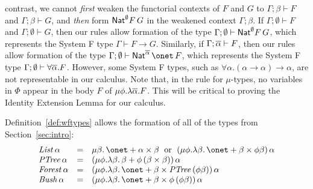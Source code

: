 \documentclass{lmcs}
\theoremstyle{plain}\newtheorem{satz}[thm]{Satz}
\begin{document}
{contrast, we cannot {\em first} weaken the functorial contexts of $F$
and $G$ to $\Gamma; \beta \vdash F$ and $\Gamma; \beta \vdash G$, and
{\em then} form $\mathsf{Nat}^\emptyset F \,G$ in the weakened context
$\Gamma; \beta$.  If $\Gamma;\emptyset \vdash F$ and $\Gamma;\emptyset
\vdash G$, then our rules allow formation of the type
$\Gamma;\emptyset \vdash \mathsf{Nat}^\emptyset F \,G$, which represents the
System F type $\Gamma \vdash F \to G$. Similarly, if
$\Gamma;\overline{\alpha} \vdash F$, then our rules allow formation of the
type $\Gamma; \emptyset \vdash \Nat^{\ol\alpha} \,\onet \,F$, which
represents the System F type $\Gamma; \emptyset \vdash \forall
\overline{\alpha} . F$. However, some System F types, such as $\forall
\alpha. (\alpha \to \alpha) \to \alpha$, are not representable in our
calculus. Note that, in the rule for $\mu$-types, no variables in
$\Phi$ appear in the body $F$ of $\mu \phi. \lambda \overline{\alpha}.F$. This
will be critical to proving the Identity Extension Lemma for our
calculus.

Definition~\ref{def:wftypes} allows the formation of all of the types
from Section~\ref{sec:intro}:
\[\begin{array}{lll}
\mathit{List}\, \alpha & = & \mu \beta. \,\onet + \alpha \times
\beta\; \mbox{ or } \; (\mu \phi. \lambda \beta.\,\onet + \beta \times \phi
\beta)\,\alpha\\ 
\mathit{PTree}\,\alpha & = & (\mu \phi. \lambda \beta.\,\beta +
\phi\,(\beta \times \beta))\,\alpha\\
\mathit{Forest}\,\alpha & = & (\mu \phi. \lambda \beta. \,\onet +
\beta \times \mathit{PTree}\,(\phi \beta))\,\alpha\\ 
\mathit{Bush}\,\alpha & = & (\mu \phi.\lambda \beta. \,\onet + \beta
\times \phi\,(\phi\beta))\,\alpha 
\end{array}\]
           
}
\end{document}
